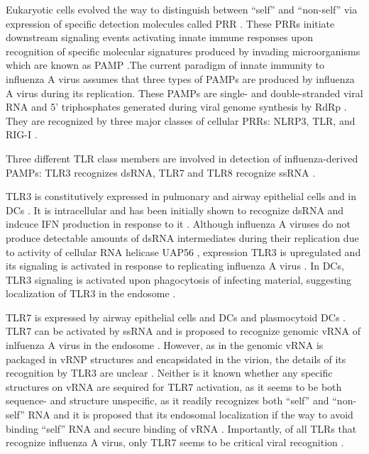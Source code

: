 		Eukaryotic cells evolved the way to distinguish between ``self'' and ``non-self'' via expression of specific detection molecules called \gls{PRR} \parencite{Janeway2002}. These \gls{PRR}s initiate downstream signaling events activating innate immune responses upon recognition of specific molecular signatures produced by invading microorganisms which are known as \gls{PAMP} \parencite{Janeway1989}.The current paradigm of innate immunity to influenza A virus assumes that three types of \gls{PAMP}s are produced by influenza A virus during its replication. These \gls{PAMP}s are single- and double-stranded viral RNA and 5' triphosphates generated during viral genome synthesis by \gls{RdRp} \parencite{Guillot2005, Hornung2006, Kato2006, Lund2004}. They are recognized by three major classes of cellular \gls{PRR}s: \gls{NLRP3}, \gls{TLR}, and \gls{RIG-I} \parencite{Iwasaki2014}.
		
		Three different \gls{TLR} class members are involved in detection of influenza-derived \gls{PAMP}s: \gls{TLR}3 recognizes dsRNA, \gls{TLR}7 and \gls{TLR}8 recognize ssRNA \parencite{Iwasaki2014}. 
		
		\gls{TLR}3 is constitutively expressed in pulmonary and airway epithelial  cells and in \gls{DC}s \parencite{Guillot2005, Schulz2005, Ioannidis2013}. It is intracellular and has been initially shown to recognize dsRNA and indcuce \gls{IFN} production in response to it \parencite{Alexopoulou2001, Guillot2005}. Although influenza A viruses do not produce detectable amounts of dsRNA intermediates during their replication due to activity of cellular RNA helicase UAP56 \parencite{Wisskirchen2011}, expression \gls{TLR}3 is upregulated and its signaling is activated in response to replicating influenza A virus \parencite{Guillot2005}. In \gls{DC}s, \gls{TLR}3 signaling is activated upon phagocytosis of infecting material, suggesting localization of \gls{TLR}3 in the endosome \parencite{Schulz2005}. 
				
		\gls{TLR}7 is expressed by airway epithelial cells and \gls{DC}s and plasmocytoid \gls{DC}s \parencite{Ioannidis2013, Lund2004}. \gls{TLR}7 can be activated by ssRNA and is proposed to recognize genomic vRNA of inlfuenza A virus in the endosome \parencite{Diebold2004}. However, as in the genomic vRNA is packaged in \gls{vRNP} structures and encapsidated in the virion, the details of its recognition by \gls{TLR}3 are unclear \parencite{Diebold2004}. Neither is it known whether any specific structures on vRNA are sequired for \gls{TLR}7 activation, as it seems to be both sequence- and structure unspecific, as it readily recognizes both ``self'' and ``non-self'' RNA and it is proposed that its endosomal localization if the way to avoid binding ``self'' RNA and secure binding of vRNA \parencite{Diebold2004}. Importantly, of all \gls{TLR}s that recognize influenza A virus, only \gls{TLR}7 seems to be critical viral recognition \parencite{Lund2004}.
		
